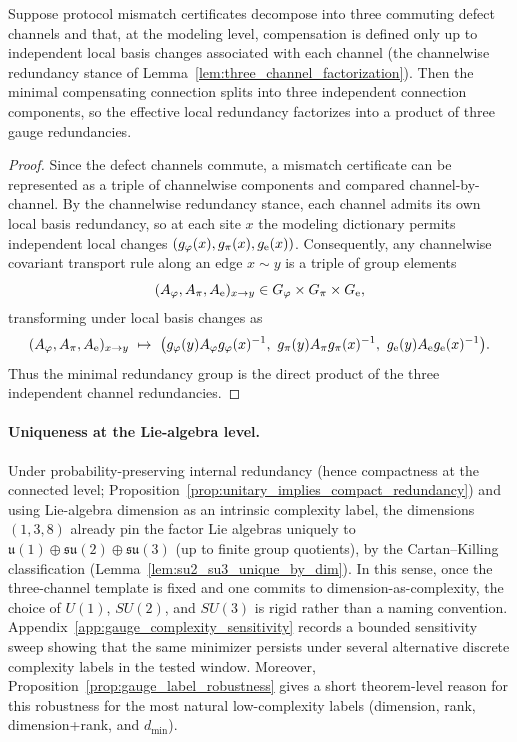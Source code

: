 \begin{proposition}\label{prop:three_factor_compensation}
Suppose protocol mismatch certificates decompose into three commuting defect channels and that, at the modeling level, compensation is defined only up to independent local basis changes associated with each channel (the channelwise redundancy stance of Lemma~\ref{lem:three_channel_factorization}).
Then the minimal compensating connection splits into three independent connection components, so the effective local redundancy factorizes into a product of three gauge redundancies.
\end{proposition}
\begin{proof}
Since the defect channels commute, a mismatch certificate can be represented as a triple of channelwise components and compared channel-by-channel.
By the channelwise redundancy stance, each channel admits its own local basis redundancy, so at each site $x$ the modeling dictionary permits independent local changes $(g_\varphi(x),g_\pi(x),g_{\mathrm{e}}(x))$.
Consequently, any channelwise covariant transport rule along an edge $x\sim y$ is a triple of group elements
\[
(A_\varphi,A_\pi,A_{\mathrm{e}})_{x\to y}\in G_\varphi\times G_\pi\times G_{\mathrm{e}},
\]
transforming under local basis changes as
\[
(A_\varphi,A_\pi,A_{\mathrm{e}})_{x\to y}\ \mapsto\
\bigl(g_\varphi(y)A_\varphi g_\varphi(x)^{-1},\ g_\pi(y)A_\pi g_\pi(x)^{-1},\ g_{\mathrm{e}}(y)A_{\mathrm{e}} g_{\mathrm{e}}(x)^{-1}\bigr).
\]
Thus the minimal redundancy group is the direct product of the three independent channel redundancies.
\end{proof}

\paragraph{Uniqueness at the Lie-algebra level.}
Under probability-preserving internal redundancy (hence compactness at the connected level; Proposition~\ref{prop:unitary_implies_compact_redundancy}) and using Lie-algebra dimension as an intrinsic complexity label, the dimensions $(1,3,8)$ already pin the factor Lie algebras uniquely to $\mathfrak{u}(1)\oplus\mathfrak{su}(2)\oplus\mathfrak{su}(3)$ (up to finite group quotients), by the Cartan--Killing classification (Lemma~\ref{lem:su2_su3_unique_by_dim}).
In this sense, once the three-channel template is fixed and one commits to dimension-as-complexity, the choice of $U(1)$, $SU(2)$, and $SU(3)$ is rigid rather than a naming convention.
Appendix~\ref{app:gauge_complexity_sensitivity} records a bounded sensitivity sweep showing that the same minimizer persists under several alternative discrete complexity labels in the tested window.
Moreover, Proposition~\ref{prop:gauge_label_robustness} gives a short theorem-level reason for this robustness for the most natural low-complexity labels (dimension, rank, dimension+rank, and $d_{\min}$).

